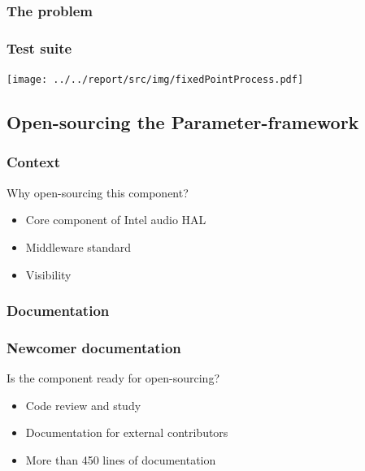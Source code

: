 \begin{frame}
    \frametitle{The problem}
    
\end{frame}

\begin{frame}
    \frametitle{Test suite}
    \centering
    \texttt{[image: ../../report/src/img/fixedPointProcess.pdf]}
\end{frame}

\subsection{Open-sourcing the Parameter-framework}
\subsubsection{Context}
\begin{FrameWithSubSection}
    \begin{block}{Why open-sourcing this component?}
        \begin{itemize}
            \item Core component of Intel audio HAL
            \item Middleware standard
            \item Visibility
        \end{itemize}
    \end{block}
\end{FrameWithSubSection}

\subsubsection{Documentation}
\begin{frame}
    \frametitle{Newcomer documentation}
    \centering
    \begin{block}{Is the component ready for open-sourcing?}
        \begin{itemize}
            \item Code review and study
            \item Documentation for external contributors
            \item More than 450 lines of documentation
        \end{itemize}
    \end{block}
\end{frame}


